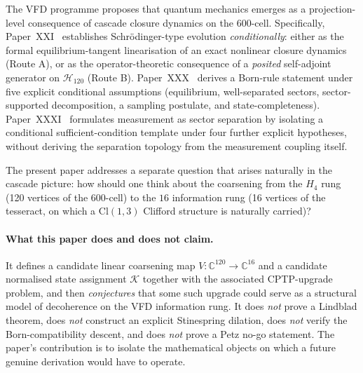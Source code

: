\documentclass[12pt]{article}
\theoremstyle{definition}
\theoremstyle{remark}
\newcommand{\Cl}{\mathrm{Cl}}
\newcommand{\Hcal}{\mathcal{H}}
\newcommand{\Kcal}{\mathcal{K}}
\begin{document}
The VFD programme proposes that quantum mechanics emerges as a projection-level consequence of cascade closure dynamics on the 600-cell. Specifically, Paper~XXI~\citep{SmartXXI} establishes Schr\"odinger-type evolution \emph{conditionally}: either as the formal equilibrium-tangent linearisation of an exact nonlinear closure dynamics (Route A), or as the operator-theoretic consequence of a \emph{posited} self-adjoint generator on $\Hcal_{120}$ (Route B). Paper~XXX~\citep{SmartXXX} derives a Born-rule statement under five explicit conditional assumptions (equilibrium, well-separated sectors, sector-supported decomposition, a sampling postulate, and state-completeness). Paper~XXXI~\citep{SmartXXXI} formulates measurement as sector separation by isolating a conditional sufficient-condition template under four further explicit hypotheses, without deriving the separation topology from the measurement coupling itself.

The present paper addresses a separate question that arises naturally in the cascade picture: how should one think about the coarsening from the $H_4$ rung (120 vertices of the 600-cell) to the $16$ information rung (16 vertices of the tesseract, on which a $\Cl(1,3)$ Clifford structure is naturally carried)?

\paragraph{What this paper does and does not claim.} It defines a candidate linear coarsening map $V: \mathbb{C}^{120} \to \mathbb{C}^{16}$ and a candidate normalised state assignment $\Kcal$ together with the associated CPTP-upgrade problem, and then \emph{conjectures} that some such upgrade could serve as a structural model of decoherence on the VFD information rung. It does \emph{not} prove a Lindblad theorem, does \emph{not} construct an explicit Stinespring dilation, does \emph{not} verify the Born-compatibility descent, and does \emph{not} prove a Petz no-go statement. The paper's contribution is to isolate the mathematical objects on which a future genuine derivation would have to operate.
\end{document}
